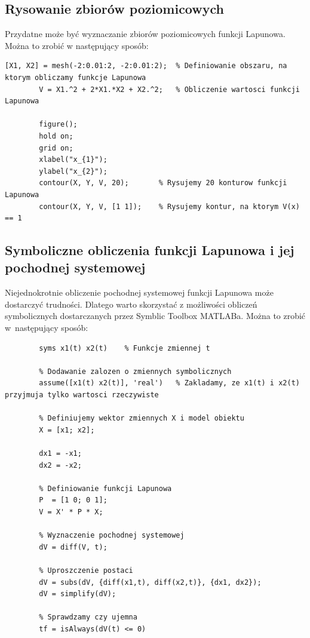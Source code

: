 \documentclass{article}
\begin{document}
    \subsection{Rysowanie zbiorów poziomicowych}
    Przydatne może być wyznaczanie zbiorów poziomicowych funkcji Lapunowa.
    Można to zrobić w następujący sposób:
    \begin{lstlisting}[style=Matlab-editor]
        [X1, X2] = mesh(-2:0.01:2, -2:0.01:2);  % Definiowanie obszaru, na ktorym obliczamy funkcje Lapunowa
        V = X1.^2 + 2*X1.*X2 + X2.^2;   % Obliczenie wartosci funkcji Lapunowa

        figure();
        hold on;
        grid on;
        xlabel("x_{1}");
        ylabel("x_{2}");
        contour(X, Y, V, 20);       % Rysujemy 20 konturow funkcji Lapunowa
        contour(X, Y, V, [1 1]);    % Rysujemy kontur, na ktorym V(x) == 1
    \end{lstlisting}

    \subsection{Symboliczne obliczenia funkcji Lapunowa i jej pochodnej systemowej}
    Niejednokrotnie obliczenie pochodnej systemowej funkcji Lapunowa może dostarczyć trudności. Dlatego warto skorzystać z możliwości obliczeń symbolicznych dostarczanych przez Symblic Toolbox MATLABa.
    Można to zrobić w~następujący sposób:
    \begin{lstlisting}[style=Matlab-editor]
        % Definiowanie zmiennych symbolicznych
        syms x1(t) x2(t)    % Funkcje zmiennej t

        % Dodawanie zalozen o zmiennych symbolicznych
        assume([x1(t) x2(t)], 'real')   % Zakladamy, ze x1(t) i x2(t) przyjmuja tylko wartosci rzeczywiste

        % Definiujemy wektor zmiennych X i model obiektu
        X = [x1; x2];
        
        dx1 = -x1;
        dx2 = -x2;

        % Definiowanie funkcji Lapunowa
        P  = [1 0; 0 1];
        V = X' * P * X;

        % Wyznaczenie pochodnej systemowej
        dV = diff(V, t);

        % Uproszczenie postaci
        dV = subs(dV, {diff(x1,t), diff(x2,t)}, {dx1, dx2});
        dV = simplify(dV);

        % Sprawdzamy czy ujemna
        tf = isAlways(dV(t) <= 0)
    \end{lstlisting}
\end{document}
